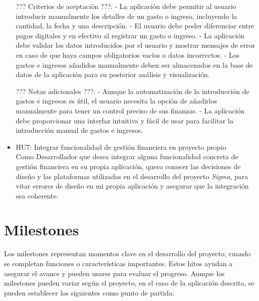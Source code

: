 \begin{itemize}
    ??? Criterios de aceptación ???:
    - La aplicación debe permitir al usuario introducir manualmente los detalles de un gasto o ingreso, incluyendo la cantidad, la fecha y una descripción.
    - El usuario debe poder diferenciar entre pagos digitales y en efectivo al registrar un gasto o ingreso.
    - La aplicación debe validar los datos introducidos por el usuario y mostrar mensajes de error en caso de que haya campos obligatorios vacíos o datos incorrectos.
    - Los gastos e ingresos añadidos manualmente deben ser almacenados en la base de datos de la aplicación para su posterior análisis y visualización.

    ??? Notas adicionales ???:
    - Aunque la automatización de la introducción de gastos e ingresos es útil, el usuario necesita la opción de añadirlos manualmente para tener un control preciso de sus finanzas.
    - La aplicación debe proporcionar una interfaz intuitiva y fácil de usar para facilitar la introducción manual de gastos e ingresos. 

    \item HU7: Integrar funcionalidad de gestión financiera en proyecto propio\\
    Como Desarrollador que desea integrar alguna funcionalidad concreta de gestión financiera en su propia aplicación, quero conocer las decisiones de diseño y las plataformas utilizadas en el desarrollo del proyecto \textit{Sigma}, para vitar errores de diseño en mi propia aplicación y asegurar que la integración sea coherente.
    
\end{itemize}

\section{Milestones}    
Los milestones representan momentos clave en el desarrollo del proyecto, cuando se completan funciones o características importantes. Estos hitos ayudan a asegurar el avance y pueden usarse para evaluar el progreso. Aunque los milestones pueden variar según el proyecto, en el caso de la aplicación descrita, se pueden establecer los siguientes como punto de partida:

